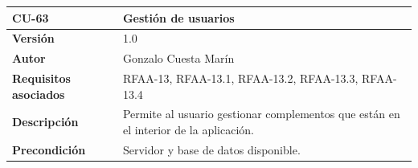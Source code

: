 \documentclass[
]{article}
\begin{document}
\begin{longtable}[]{@{}ll@{}}
\toprule
\begin{minipage}[b]{0.21\columnwidth}\raggedright
\textbf{CU-63}\strut
\end{minipage} & \begin{minipage}[b]{0.73\columnwidth}\raggedright
\textbf{Gestión de usuarios}\strut
\end{minipage}\tabularnewline
\midrule
\endhead
\begin{minipage}[t]{0.21\columnwidth}\raggedright
\textbf{Versión}\strut
\end{minipage} & \begin{minipage}[t]{0.73\columnwidth}\raggedright
1.0\strut
\end{minipage}\tabularnewline
\begin{minipage}[t]{0.21\columnwidth}\raggedright
\textbf{Autor}\strut
\end{minipage} & \begin{minipage}[t]{0.73\columnwidth}\raggedright
Gonzalo Cuesta Marín\strut
\end{minipage}\tabularnewline
\begin{minipage}[t]{0.21\columnwidth}\raggedright
\textbf{Requisitos asociados}\strut
\end{minipage} & \begin{minipage}[t]{0.73\columnwidth}\raggedright
RFAA-13, RFAA-13.1, RFAA-13.2, RFAA-13.3, RFAA-13.4\strut
\end{minipage}\tabularnewline
\begin{minipage}[t]{0.21\columnwidth}\raggedright
\textbf{Descripción}\strut
\end{minipage} & \begin{minipage}[t]{0.73\columnwidth}\raggedright
Permite al usuario gestionar complementos que están en el interior de la
aplicación.\strut
\end{minipage}\tabularnewline
\begin{minipage}[t]{0.21\columnwidth}\raggedright
\textbf{Precondición}\strut
\end{minipage} & \begin{minipage}[t]{0.73\columnwidth}\raggedright
Servidor y base de datos disponible.


\end{minipage}
\end{longtable}
\end{document}
